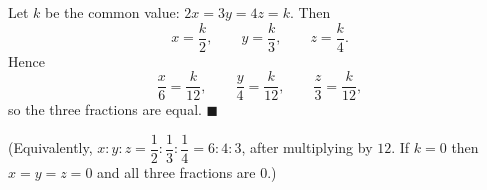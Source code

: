 Let $k$ be the common value: $2x=3y=4z=k$. Then
\[
x=\dfrac {k}{2},\qquad y=\dfrac {k}{3},\qquad z=\dfrac {k}{4} .
\]
Hence
\[
\dfrac {x}{6}=\dfrac{k}{12},\qquad\dfrac {y}{4}=\dfrac{k}{12},\qquad\dfrac {z}{3}=\dfrac{k}{12},
\]
so the three fractions are equal. $\blacksquare$

(Equivalently, $x:y:z=\dfrac{1}{2}:\dfrac{1}{3}:\dfrac{1}{4}=6:4:3$, after multiplying by $12$. If $k=0$ then $x=y=z=0$ and all three fractions are $0$.)
